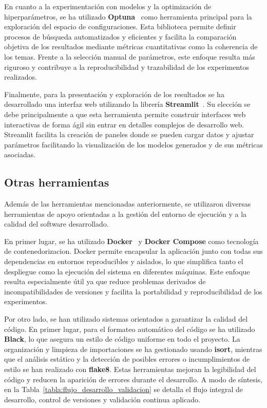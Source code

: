 En cuanto a la experimentación con modelos y la optimización de
hiperparámetros, se ha utilizado
\textbf{Optuna}~\cite{OptunaHyperparameterOptimization} como herramienta
principal para la exploración del espacio de configuraciones. Esta biblioteca
permite definir procesos de búsqueda automatizados y eficientes y facilita la
comparación objetiva de los resultados mediante métricas cuantitativas como la
coherencia de los temas. Frente a la selección manual de parámetros, este
enfoque resulta más riguroso y contribuye a la reproducibilidad y trazabilidad
de los experimentos realizados.

Finalmente, para la presentación y exploración de los resultados se ha
desarrollado una interfaz web utilizando la librería
\textbf{Streamlit}~\cite{StreamlitDocsa}. Su elección se debe principalmente a
que esta herramienta permite construir interfaces web interactivas de forma
ágil sin entrar en detalles complejos de desarrollo web. Streamlit facilita la
creación de paneles donde se pueden cargar datos y ajustar parámetros
facilitando la visualización de los modelos generados y de sus métricas
asociadas.

\subsection{Otras herramientas}

Además de las herramientas mencionadas anteriormente, se utilizaron diversas
herramientas de apoyo orientadas a la gestión del entorno de ejecución y a la
calidad del software desarrollado.

En primer lugar, se ha utilizado \textbf{Docker}~\cite{DockerManuals} y
\textbf{Docker Compose} como tecnología de \gls{contenedorizacion}. Docker
permite encapsular la aplicación junto con todas sus dependencias en entornos
reproducibles y aislados, lo que simplifica tanto el despliegue como la
ejecución del sistema en diferentes máquinas. Este enfoque resulta
especialmente útil ya que reduce problemas derivados de incompatibilidades de
versiones y facilita la portabilidad y reproducibilidad de los experimentos.

Por otro lado, se han utilizado sistemas orientados a garantizar la calidad del
código. En primer lugar, para el formateo automático del código se ha utilizado
\textbf{Black}, lo que asegura un estilo de código uniforme en todo el
proyecto. La organización y limpieza de importaciones se ha gestionado usando
\textbf{isort}, mientras que el análisis estático y la detección de posibles
errores o incumplimientos de estilo se han realizado con \textbf{flake8}. Estas
herramientas mejoran la legibilidad del código y reducen la aparición de
errores durante el desarrollo. A modo de síntesis, en la
Tabla~\ref{tabla:flujo_desarrollo_validacion} se detalla el flujo integral de
desarrollo, control de versiones y validación continua aplicado.

